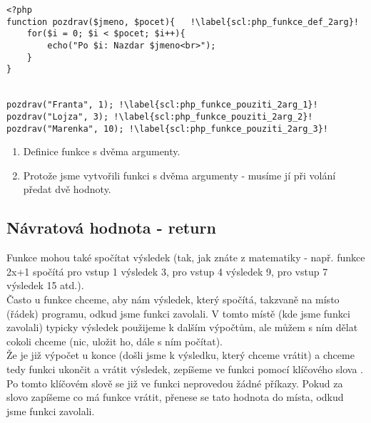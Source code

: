 \begin{minipage}[t]{.45\textwidth}
\begin{code}
\begin{verbatim}
<?php
function pozdrav($jmeno, $pocet){	!\label{scl:php_funkce_def_2arg}!
	for($i = 0; $i < $pocet; $i++){
		echo("Po $i: Nazdar $jmeno<br>");
	}
}
	
	
pozdrav("Franta", 1); !\label{scl:php_funkce_pouziti_2arg_1}!
pozdrav("Lojza", 3); !\label{scl:php_funkce_pouziti_2arg_2}!
pozdrav("Marenka", 10); !\label{scl:php_funkce_pouziti_2arg_3}!
\end{verbatim}

\label{code:php_funkce_2arg}
\end{code}
\end{minipage}
\begin{minipage}[t]{.45\textwidth}
\begin{enumerate}
\vspace{1.5cm}
\item[ř. \ref{scl:php_funkce_def}:] Definice funkce s dvěma argumenty.
\item[ř. \ref{scl:php_funkce_pouziti_2arg_1}, \ref{scl:php_funkce_pouziti_2arg_2}, \ref{scl:php_funkce_pouziti_2arg_3}:] Protože jsme vytvořili funkci s dvěma argumenty - musíme jí při volání předat dvě hodnoty.
\end{enumerate}
\end{minipage}

\subsection{Návratová hodnota - return}
Funkce mohou také spočítat výsledek (tak, jak znáte z matematiky - např. funkce 2x+1 spočítá pro vstup 1 výsledek 3, pro vstup 4 výsledek 9, pro vstup 7 výsledek 15 atd.).\\
Často u funkce chceme, aby nám výsledek, který spočítá, takzvaně  na místo (řádek) programu, odkud jsme funkci zavolali. V tomto místě (kde jsme funkci zavolali) typicky výsledek použijeme k dalším výpočtům, ale můžem s ním dělat cokoli chceme (nic, uložit ho, dále s ním počítat).\\
Že je již výpočet u konce (došli jsme k výsledku, který chceme vrátit) a chceme tedy funkci ukončit a vrátit výsledek, zepíšeme ve funkci pomocí klíčového slova . Po tomto klíčovém slově se již ve funkci neprovedou žádné příkazy. Pokud za slovo  zapíšeme co má funkce vrátit, přenese se tato hodnota do místa, odkud jsme funkci zavolali.\\

